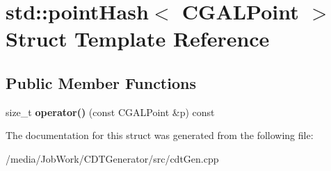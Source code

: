 \hypertarget{structstd_1_1pointHash_3_01CGALPoint_01_4}{\section{std\-:\-:point\-Hash$<$ C\-G\-A\-L\-Point $>$ Struct Template Reference}
\label{structstd_1_1pointHash_3_01CGALPoint_01_4}
}
\subsection*{Public Member Functions}
\begin{DoxyCompactItemize}
\item 
\hypertarget{structstd_1_1pointHash_3_01CGALPoint_01_4_af8cd993c28e798853bed75e231682be7}{size\-\_\-t {\bfseries operator()} (const C\-G\-A\-L\-Point \&p) const }\label{structstd_1_1pointHash_3_01CGALPoint_01_4_af8cd993c28e798853bed75e231682be7}

\end{DoxyCompactItemize}


The documentation for this struct was generated from the following file\-:\begin{DoxyCompactItemize}
\item 
/media/\-Job\-Work/\-C\-D\-T\-Generator/src/cdt\-Gen.\-cpp\end{DoxyCompactItemize}
